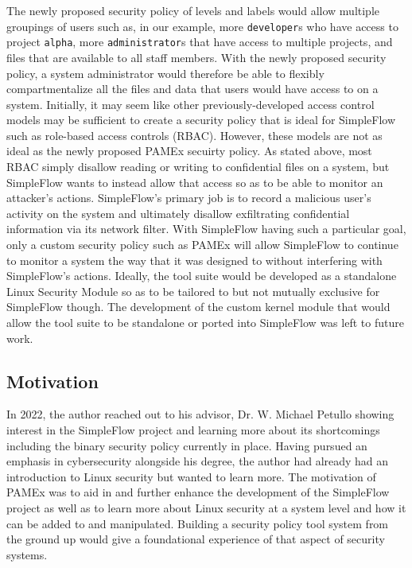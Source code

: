 The newly proposed security policy of levels and labels 
would allow multiple groupings of users such as, in our example, 
more \texttt{developer}s who have access to project \texttt{alpha}, more \texttt{administrator}s that 
have access to multiple projects,
and files that are available to all staff members. With the newly proposed security policy, 
a system administrator would therefore be able 
to flexibly compartmentalize all the files and data that users would have 
access to on a system. Initially, it may seem like other previously-developed access control models may be sufficient
to create a security policy that is ideal for SimpleFlow such as role-based access controls (RBAC).
However, these models are not as ideal as the newly proposed PAMEx secuirty policy.
As stated above, most RBAC simply disallow reading or writing to confidential files on a system, but SimpleFlow 
wants to instead allow that access so as to be able to monitor an attacker's actions. SimpleFlow's primary job is
to record a malicious user's activity on the system and ultimately disallow exfiltrating confidential information
via its network filter. With SimpleFlow having such a particular goal, only a custom security policy such as PAMEx will allow SimpleFlow
to continue to monitor a system the way that it was designed to without interfering with SimpleFlow's actions.
Ideally, the tool suite would be developed as a standalone 
Linux Security Module so as to be tailored to but not mutually 
exclusive for SimpleFlow though. The development of the custom kernel module that would allow the tool suite to be standalone
or ported into SimpleFlow was left to future work.


\subsection{Motivation}
\par 
\vspace{\baselineskip}
\hspace{1em}
In 2022, the author reached out to his advisor, Dr. W. Michael 
Petullo showing interest in the SimpleFlow project and learning more about 
its shortcomings including the binary security policy currently in 
place. Having pursued an emphasis in cybersecurity alongside his 
degree, the author had already had an introduction to Linux security 
but wanted to learn more. The motivation of PAMEx was to aid in and 
further enhance the development of the SimpleFlow project as well as 
to learn more about Linux security at a system level and how it can 
be added to and manipulated. Building a security policy tool system 
from the ground up would give a foundational experience of 
that aspect of security systems. 

